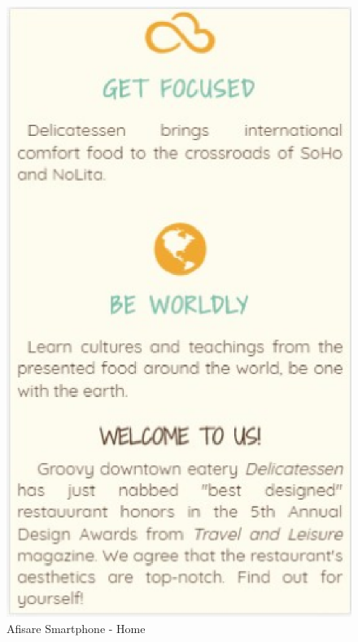 \documentclass[11pt]{article}
\begin{document}
\begin{figure}[h]
\includegraphics{images/71.eps}
\caption{Afisare Smartphone - Home}
\end{figure}\
\end{document}
